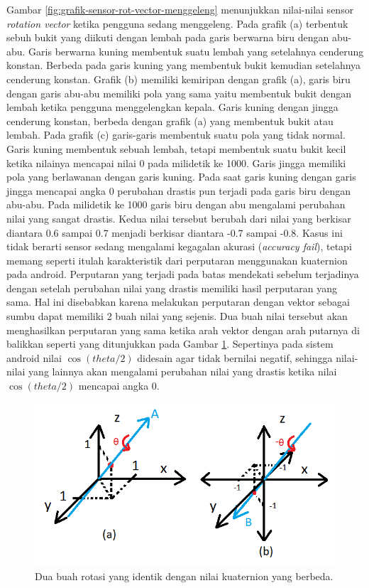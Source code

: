 Gambar \ref{fig:grafik-sensor-rot-vector-menggeleng} menunjukkan nilai-nilai sensor \textit{rotation vector} ketika pengguna sedang menggeleng. Pada grafik (a) terbentuk sebuh bukit yang diikuti dengan lembah pada garis berwarna biru dengan abu-abu. Garis berwarna kuning membentuk suatu lembah yang setelahnya cenderung konstan. Berbeda pada garis kuning yang membentuk bukit kemudian setelahnya cenderung konstan. Grafik (b) memiliki kemiripan dengan grafik (a), garis biru dengan garis abu-abu memiliki pola yang sama yaitu membentuk bukit dengan lembah ketika pengguna menggelengkan kepala. Garis kuning dengan jingga cenderung konstan, berbeda dengan grafik (a) yang membentuk bukit atau lembah. Pada grafik (c) garis-garis membentuk suatu pola yang tidak normal. Garis kuning membentuk sebuah lembah, tetapi membentuk suatu bukit kecil ketika nilainya mencapai nilai 0 pada milidetik ke 1000. Garis jingga memiliki pola yang berlawanan dengan garis kuning. Pada saat garis kuning dengan garis jingga mencapai angka 0 perubahan drastis pun terjadi pada garis biru dengan abu-abu. Pada milidetik ke 1000 garis biru dengan abu mengalami perubahan nilai yang sangat drastis. Kedua nilai tersebut berubah dari nilai yang berkisar diantara 0.6 sampai 0.7 menjadi berkisar diantara -0.7 sampai -0.8. Kasus ini tidak berarti sensor sedang mengalami kegagalan akurasi (\textit{accuracy fail}), tetapi memang seperti itulah karakteristik dari perputaran menggunakan kuaternion pada android. Perputaran yang terjadi pada batas mendekati sebelum terjadinya dengan setelah perubahan nilai yang drastis memiliki hasil perputaran yang sama. Hal ini disebabkan karena melakukan perputaran dengan vektor sebagai sumbu dapat memiliki 2 buah nilai yang sejenis. Dua buah nilai tersebut akan menghasilkan perputaran yang sama ketika arah vektor dengan arah putarnya di balikkan seperti yang ditunjukkan pada Gambar \ref{fig:penjelasan-perputaran-quaternion-android-sensor}. Sepertinya pada sistem android nilai $\cos (theta/2)$ didesain agar tidak bernilai negatif, sehingga nilai-nilai yang lainnya akan mengalami perubahan nilai yang drastis ketika nilai $\cos (theta/2)$ mencapai angka 0.


\begin{figure}[htbp]
\centering
\includegraphics[scale=0.6]{Gambar/penjelasan-perputaran-quaternion-android-sensor.png}
\caption{Dua buah rotasi yang identik dengan nilai kuaternion yang berbeda.} 
\label{fig:penjelasan-perputaran-quaternion-android-sensor}
\end{figure}

